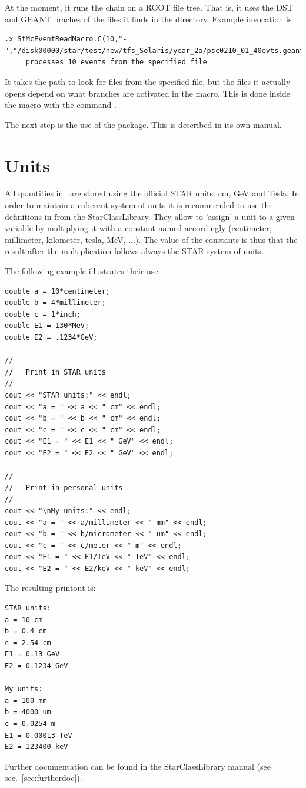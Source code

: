 At the moment, it runs the chain on a ROOT file tree.  That is, it uses the DST
and GEANT braches of the files it finds in the directory.  Example invocation
is 
\begin{verbatim}
.x StMcEventReadMacro.C(10,"-","/disk00000/star/test/new/tfs_Solaris/year_2a/psc0210_01_40evts.geant.root")
     processes 10 events from the specified file

\end{verbatim}
It takes the path to look for files from the specified file, but the files it actually opens depend on
what branches are activated in the macro.  This is done inside the macro with the command .

The next step is the use of the \StAssociationMaker package.  This is described
in its own manual.


\section{Units}
 
\label{sec:units}

All quantities in \StMcEvent\ are stored using the official STAR units:
cm, GeV and Tesla.  In order to maintain a coherent system of units it
is recommended to use the definitions in  from
the StarClassLibrary. They allow to 'assign' a unit to a given
variable by multiplying it with a constant named accordingly
(centimeter, millimeter, kilometer, tesla, MeV, ...).  The value of
the constants is thus that the result after the multiplication follows
always the STAR system of units.

The following example illustrates their use:
{\footnotesize
\begin{verbatim}
double a = 10*centimeter;
double b = 4*millimeter;
double c = 1*inch;
double E1 = 130*MeV;
double E2 = .1234*GeV;

//
//   Print in STAR units
//
cout << "STAR units:" << endl;
cout << "a = " << a << " cm" << endl;
cout << "b = " << b << " cm" << endl;
cout << "c = " << c << " cm" << endl;
cout << "E1 = " << E1 << " GeV" << endl;
cout << "E2 = " << E2 << " GeV" << endl;

//
//   Print in personal units
//
cout << "\nMy units:" << endl;
cout << "a = " << a/millimeter << " mm" << endl;
cout << "b = " << b/micrometer << " um" << endl;
cout << "c = " << c/meter << " m" << endl;
cout << "E1 = " << E1/TeV << " TeV" << endl;
cout << "E2 = " << E2/keV << " keV" << endl;
\end{verbatim}
}%
The resulting printout is:
{\footnotesize
\begin{verbatim}
STAR units:
a = 10 cm
b = 0.4 cm
c = 2.54 cm
E1 = 0.13 GeV
E2 = 0.1234 GeV

My units:
a = 100 mm
b = 4000 um
c = 0.0254 m
E1 = 0.00013 TeV
E2 = 123400 keV
\end{verbatim}
}%
Further documentation can be found in the StarClassLibrary manual
(see sec.~\ref{sec:furtherdoc}).

